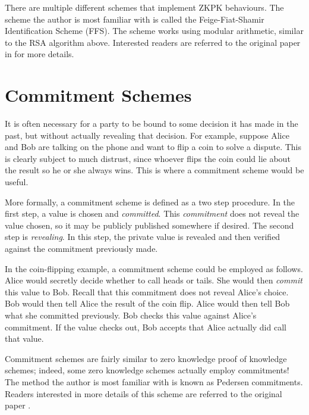 There are multiple different schemes that implement ZKPK behaviours. 
The scheme the author is most familiar with is called the Feige-Fiat-Shamir Identification Scheme (FFS). 
The scheme works using modular arithmetic, similar to the RSA algorithm above.
Interested readers are referred to the original paper in \cite{ffs} for more details. 

\section{Commitment Schemes}
It is often necessary for a party to be bound to some decision it has made in the past, but without
actually revealing that decision. For example, suppose Alice and Bob are talking on the phone and
want to flip a coin to solve a dispute. This is clearly subject to much distrust, since whoever flips the
coin could lie about the result so he or she always wins.
This is where a commitment scheme would be useful.

More formally, a commitment scheme is defined as a two step procedure. In the first step, a value
is chosen and \textit{committed}. This \textit{commitment} does not reveal the value chosen, so it
may be publicly published somewhere if desired. The second step is \textit{revealing}. In this step,
the private value is revealed and then verified against the commitment previously made.

In the coin-flipping example, a commitment scheme could be employed as follows. Alice would 
secretly decide whether to call heads or tails. She would then \textit{commit} this value to Bob. Recall
that this commitment does not reveal Alice's choice. Bob would then tell Alice the result of the coin
flip. Alice would then tell Bob what she committed previously. Bob checks this value against Alice's
commitment. If the value checks out, Bob accepts that Alice actually did call that value.

Commitment schemes are fairly similar to zero knowledge proof of knowledge schemes; indeed, some
zero knowledge schemes actually employ commitments! The method the author is most familiar with
is known as Pedersen commitments. Readers interested in more details of this scheme are referred
to the original paper \cite{pedersen}.

